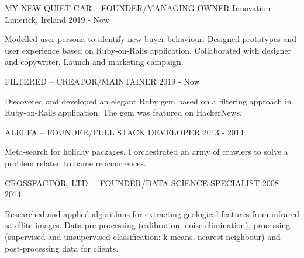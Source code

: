 


\begin{cventries}

  \cventry
    {MY NEW QUIET CAR – FOUNDER/MANAGING OWNER} %
    {Innovation} %
    {Limerick, Ireland} %
    {2019 - Now} %
    {
      \begin{cvitems} %
        \item {Modelled user persona to identify new buyer behaviour. Designed prototypes and user experience based on Ruby-on-Rails application. Collaborated with designer and copywriter. Launch and marketing campaign.}
      \end{cvitems}
    }

    \cventry
    {FILTERED – CREATOR/MAINTAINER} %
    {} %
    {} %
    {2019 - Now} %
    {
      \begin{cvitems} %
        \item {Discovered and developed an elegant Ruby gem based on a filtering approach in Ruby-on-Rails application. The gem was featured on HackerNews.}
      \end{cvitems}
    }

    \cventry
    {ALEFFA – FOUNDER/FULL STACK DEVELOPER} %
    {} %
    {} %
    {2013 - 2014} %
    {
      \begin{cvitems} %
        \item {Meta-search for holiday packages. I orchestrated an army of crawlers to solve a problem related to name reoccurrences.}
      \end{cvitems}
    }

    \cventry
    {CROSSFACTOR, LTD. – FOUNDER/DATA SCIENCE SPECIALIST} %
    {} %
    {} %
    {2008 - 2014} %
    {
      \begin{cvitems} %
        \item {Researched and applied algorithms for extracting geological features from infrared satellite images. Data pre-processing (calibration, noise elimination), processing (supervised and unsupervised classification: k-means, nearest neighbour) and post-processing data for clients.}
      \end{cvitems}
    }


\end{cventries}
